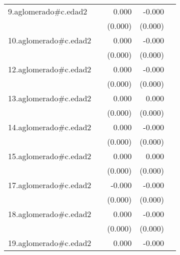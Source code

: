 {\begin{longtable}{l*{4}{D{.}{.}{-1}}}
\addlinespace
9.aglomerado#c.edad2&                     &       0.000         &      -0.000         &                     \\
            &                     &     (0.000)         &     (0.000)         &                     \\
\addlinespace
10.aglomerado#c.edad2&                     &       0.000         &      -0.000         &                     \\
            &                     &     (0.000)         &     (0.000)         &                     \\
\addlinespace
12.aglomerado#c.edad2&                     &       0.000         &      -0.000         &                     \\
            &                     &     (0.000)         &     (0.000)         &                     \\
\addlinespace
13.aglomerado#c.edad2&                     &       0.000\sym{*}  &       0.000         &                     \\
            &                     &     (0.000)         &     (0.000)         &                     \\
\addlinespace
14.aglomerado#c.edad2&                     &       0.000         &      -0.000\sym{*}  &                     \\
            &                     &     (0.000)         &     (0.000)         &                     \\
\addlinespace
15.aglomerado#c.edad2&                     &       0.000         &       0.000         &                     \\
            &                     &     (0.000)         &     (0.000)         &                     \\
\addlinespace
17.aglomerado#c.edad2&                     &      -0.000         &      -0.000\sym{**} &                     \\
            &                     &     (0.000)         &     (0.000)         &                     \\
\addlinespace
18.aglomerado#c.edad2&                     &       0.000         &      -0.000         &                     \\
            &                     &     (0.000)         &     (0.000)         &                     \\
\addlinespace
19.aglomerado#c.edad2&                     &       0.000         &      -0.000         &                     \\

\end{longtable}}
